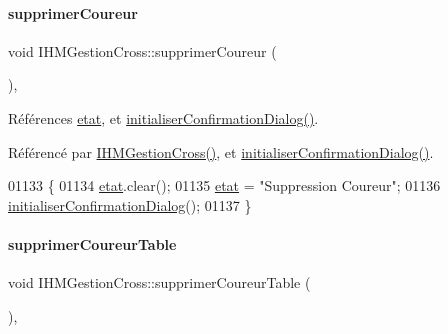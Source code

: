\paragraph{\texorpdfstring{supprimer\+Coureur}{supprimerCoureur}}
{\footnotesize\ttfamily void I\+H\+M\+Gestion\+Cross\+::supprimer\+Coureur (\begin{DoxyParamCaption}{ }\end{DoxyParamCaption})\hspace{0.3cm}{\ttfamily [private]}, {\ttfamily [slot]}}



Références \hyperlink{class_i_h_m_gestion_cross_a5da4390d71dbd5d05cff339f93c7c85a}{etat}, et \hyperlink{class_i_h_m_gestion_cross_a1d3c7f83d4c960f38b237499d2a89731}{initialiser\+Confirmation\+Dialog()}.



Référencé par \hyperlink{class_i_h_m_gestion_cross_a2c62fd83326a87456a403f46acc408c8}{I\+H\+M\+Gestion\+Cross()}, et \hyperlink{class_i_h_m_gestion_cross_aa1c728319c825df582a014fc5bd43ea4}{initialiser\+Confirmation\+Dialog()}.


\begin{DoxyCode}
01133 \{
01134     \hyperlink{class_i_h_m_gestion_cross_a5da4390d71dbd5d05cff339f93c7c85a}{etat}.clear();
01135     \hyperlink{class_i_h_m_gestion_cross_a5da4390d71dbd5d05cff339f93c7c85a}{etat} = \textcolor{stringliteral}{"Suppression Coureur"};
01136     \hyperlink{class_i_h_m_gestion_cross_a1d3c7f83d4c960f38b237499d2a89731}{initialiserConfirmationDialog}();
01137 \}
\end{DoxyCode}
\mbox{\label{class_i_h_m_gestion_cross_af13fabb9831fcd237c9c1e7ee75c47b8}} 
\paragraph{\texorpdfstring{supprimer\+Coureur\+Table}{supprimerCoureurTable}}
{\footnotesize\ttfamily void I\+H\+M\+Gestion\+Cross\+::supprimer\+Coureur\+Table (\begin{DoxyParamCaption}{ }\end{DoxyParamCaption})\hspace{0.3cm}{\ttfamily [private]}, {\ttfamily [slot]}}



